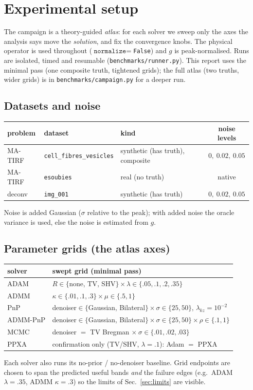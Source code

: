 \section{Experimental setup}
\label{sec:setup}

The campaign is a theory-guided \emph{atlas}: for each solver we sweep only the axes the analysis
says move the \emph{solution}, and fix the convergence knobs. The physical operator is used
throughout ($\texttt{normalize}=$\texttt{False}) and $g$ is peak-normalised. Runs are isolated,
timed and resumable (\texttt{benchmarks/runner.py}). This report uses the minimal pass (one
composite truth, tightened grids); the full atlas (two truths, wider grids) is in
\texttt{benchmarks/campaign.py} for a deeper run.

\subsection{Datasets and noise}
\begin{center}
\begin{tabular}{lllc}
\toprule
problem & dataset & kind & noise levels \\
\midrule
MA-TIRF & \texttt{cell\_fibres\_vesicles} & synthetic (has truth), composite & $0,\ 0.02,\ 0.05$ \\
MA-TIRF & \texttt{esoubies} & real (no truth) & native \\
deconv  & \texttt{img\_001} & synthetic (has truth) & $0,\ 0.02,\ 0.05$ \\
\bottomrule
\end{tabular}
\end{center}
Noise is added Gaussian ($\sigma$ relative to the peak); with added noise the oracle variance is
used, else the noise is estimated from $g$.

\subsection{Parameter grids (the atlas axes)}
\begin{center}
\begin{tabular}{ll}
\toprule
solver & swept grid (minimal pass) \\
\midrule
ADAM     & $R\in\{$none, TV, SHV$\}\times\lambda\in\{.05,.1,.2,.35\}$ \\
ADMM     & $\kappa\in\{.01,.1,.3\}\times\mu\in\{.5,1\}$ \\
PnP      & denoiser$\in\{$Gaussian, Bilateral$\}\times\sigma\in\{25,50\}$, $\lambda_{kz}=10^{-2}$ \\
ADMM-PnP & denoiser$\in\{$Gaussian, Bilateral$\}\times\sigma\in\{25,50\}\times\rho\in\{.1,1\}$ \\
MCMC     & denoiser $=$ TV Bregman $\times\ \sigma\in\{.01,.02,.03\}$ \\
PPXA     & confirmation only (TV/SHV, $\lambda=.1$): Adam $=$ PPXA \\
\bottomrule
\end{tabular}
\end{center}
Each solver also runs its no-prior / no-denoiser baseline. Grid endpoints are chosen to span the
predicted useful bands \emph{and} the failure edges (e.g.\ ADAM $\lambda=.35$, ADMM $\kappa=.3$)
so the limits of Sec.~\ref{sec:limits} are visible.

